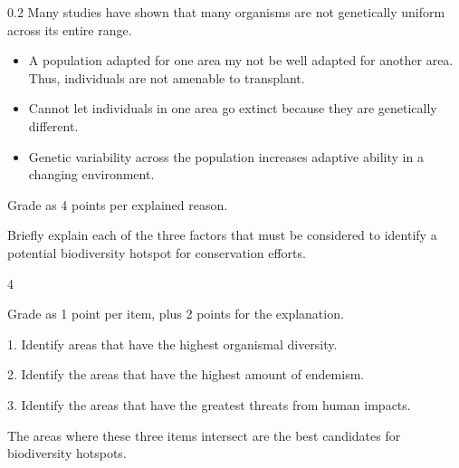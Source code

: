 \begin{AnswerPage}{0.2\textheight}
	Many studies have shown that many organisms are not genetically uniform across its entire range.  
	
	\begin{itemize}
		
		\item A population adapted for one area my not be well adapted for another area. Thus, individuals are not amenable to transplant.
		
		\item Cannot let individuals in one area go extinct because they are genetically different. 
		
		\item Genetic variability across the population increases adaptive ability in a changing environment.
	\end{itemize}
	
	Grade as 4 points per explained reason.
	
\end{AnswerPage}


\question[10]
Briefly explain each of the three factors that must be considered to identify
a potential biodiversity hotspot for conservation efforts.


\begin{AnswerPage}{4\basespace}%
	
	Grade as 1 point per item, plus 2 points for the explanation.\vspace{\baselineskip}
	
	1. Identify areas that have the highest organismal diversity.
	
	2. Identify the areas that have the highest amount of endemism.
	
	3. Identify the areas that have the greatest threats from human impacts.
	
	The areas where these three items intersect are the best candidates for biodiversity hotspots.
\end{AnswerPage}

%
%
%
